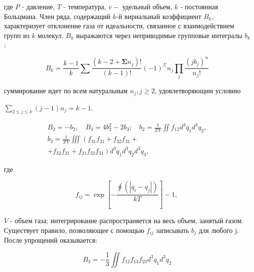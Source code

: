 \documentclass[10pt]{article}
\begin{document}
где $P$ - давление, $T$ - температура, $v-$ удельный объем, $k$ - постоянная Больцмана. Член ряда, содержащий $k$-й вириальный коэффициент $B_{k}$, характеризует отклонение газа от идеальности, связанное с взаимодействием групп из $k$ молекул. $B_{k}$ выражаются через неприводимые групповые интегралы $b_{k}$ :



\[

B_{k}=\frac{k-1}{k} \sum \frac{\left(k-2+\mathbf{\Sigma} n_{j}\right) !}{(k-1) !}(-1)^{\Sigma} n_{j} \prod_{j} \frac{\left(j b_{j}\right)^{n}}{n_{j} !}

\]



суммирование идет по всем натуральным $n_{j}, j \geqslant 2$, удовлетворяющим условию



$\sum_{2 \leqslant j \leqslant k}(j-1) n_{j}=k-1$.



\[

\begin{gathered}

B_{2}=-b_{2}, \quad B_{3}=4 b_{2}^{2}-2 b_{3} ; \quad b_{2}=\frac{1}{2 ! V} \iint f_{12} d^{3} q_{1} d^{3} q_{2}, \\

b_{3}=\frac{1}{3 ! V} \iiint\left(f_{31} f_{21}+f_{32} f_{31}+\right. \\

\left.+f_{32} f_{21}+f_{21} f_{32} f_{31}\right) d^{3} q_{1} d^{3} q_{2} d^{3} q_{3},

\end{gathered}

\]



где



\[

f_{i j}=\exp \left[-\frac{\oint\left(\left|q_{i}-q_{j}\right|\right)}{k T}\right]-1 \text {, }

\]



$V$ - объем газа; интегрирование распространяется на весь объем, занятый газом. Существует правило, позволяющее с помощью $f_{i j}$ записывать $b_{j}$ для любого j. После упрощений оказывается:



\[

B_{3}=-\frac{1}{3} \iint f_{12} f_{13} f_{23} d^{3} q_{1} d^{3} q_{2}

\]
\end{document}
